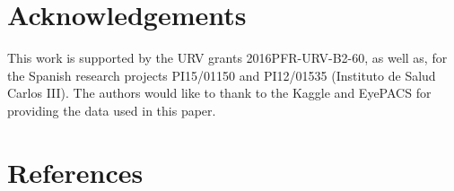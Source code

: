 \documentclass{llncs}
\begin{document}
\section*{Acknowledgements}
This work is supported by the URV grants 2016PFR-URV-B2-60, as well as, for the Spanish research projects PI15/01150 and PI12/01535 (Instituto de Salud Carlos III). The authors would like to thank to the Kaggle and EyePACS for providing the data used in this paper.

\section*{References}


\end{document}
